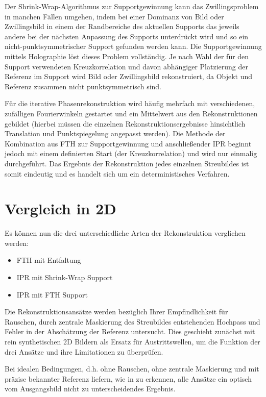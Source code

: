 Der Shrink-Wrap-Algorithmus zur Supportgewinnung kann das Zwillingsproblem in manchen Fällen umgehen, indem bei einer Dominanz von Bild oder Zwillingsbild in einem der Randbereiche des aktuellen Supports das jeweils andere bei der nächsten Anpassung des Supports unterdrückt wird und so ein nicht-punktsymmetrischer Support gefunden werden kann.
Die Supportgewinnung mittels Holographie löst dieses Problem vollständig. Je nach Wahl der für den Support verwendeten Kreuzkorrelation und davon abhängiger Platzierung der Referenz im Support wird Bild oder Zwillingsbild rekonstruiert, da Objekt und Referenz zusammen nicht punktsymmetrisch sind.

Für die iterative Phasenrekonstruktion wird häufig mehrfach mit verschiedenen, zufälligen Fourierwinkeln gestartet und ein Mittelwert aus den Rekonstruktionen gebildet (hierbei müssen die einzelnen Rekonstruktionsergebnisse hinsichtlich Translation und Punktspiegelung angepasst werden). Die Methode der Kombination aus FTH zur Supportgewinnung und anschließender IPR beginnt jedoch mit einem definierten Start (der Kreuzkorrelation) und wird nur einmalig durchgeführt. Das Ergebnis der Rekonstruktion jedes einzelnen Streubildes ist somit eindeutig und es handelt sich um ein deterministisches Verfahren.

\section{Vergleich in 2D}	
Es können nun die drei unterschiedliche Arten der Rekonstruktion verglichen werden:
\begin{itemize}
	\item FTH mit Entfaltung
	\item IPR mit Shrink-Wrap Support
	\item IPR mit FTH Support
\end{itemize}

Die Rekonstruktionsansätze werden bezüglich Ihrer Empfindlichkeit für Rauschen, durch zentrale Maskierung des Streubildes entstehenden Hochpass und Fehler in der Abschätzung der Referenz untersucht. Dies geschieht zunächst mit rein synthetischen 2D Bildern als Ersatz für Austrittswellen, um die Funktion der drei Ansätze und ihre Limitationen zu überprüfen.

Bei idealen Bedingungen, d.h. ohne Rauschen, ohne zentrale Maskierung und mit präzise bekannter Referenz liefern, wie in  zu erkennen, alle Ansätze ein optisch vom Ausgangsbild nicht zu unterscheidendes Ergebnis.

